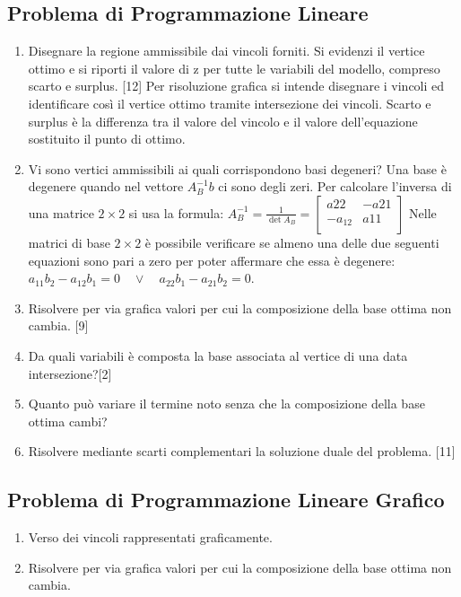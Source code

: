 \documentclass[\main/main.tex]{subfiles}
\begin{document}
\subsection{Problema di Programmazione Lineare}
\begin{enumerate}
  \item Disegnare la regione ammissibile dai vincoli forniti. Si evidenzi il vertice ottimo e si riporti il valore di z per tutte le variabili del modello, compreso scarto e surplus. [12]
        \subitem Per risoluzione grafica si intende disegnare i vincoli ed identificare così il vertice ottimo tramite intersezione dei vincoli.
        \subitem Scarto e surplus è la differenza tra il valore del vincolo e il valore dell'equazione sostituito il punto di ottimo.
  \item Vi sono vertici ammissibili ai quali corrispondono basi degeneri?
        \subitem Una base è degenere quando nel vettore $A_B^{-1}b$ ci sono degli zeri.
        \subitem Per calcolare l'inversa di una matrice $2\times 2$ si usa la formula: $A_B^{-1} = \frac{1}{\det A_B} = \begin{bmatrix}
            a{22}   & -a{21} \\
            -a_{12} & a{11}  \\
          \end{bmatrix}$
        \subitem Nelle matrici di base $2 \times 2$ è possibile verificare se almeno una delle due seguenti equazioni sono pari a zero per poter affermare che essa è degenere: $a_{11}b_2 - a_{12}b_1 = 0 \quad \lor \quad a_{22}b_1 - a_{21}b_2 = 0$.
  \item Risolvere per via grafica valori per cui la composizione della base ottima non cambia. [9]
  \item Da quali variabili è composta la base associata al vertice di una data intersezione?[2]
  \item Quanto può variare il termine noto senza che la composizione della base ottima cambi?
  \item Risolvere mediante scarti complementari la soluzione duale del problema. [11]
\end{enumerate}

\subsection{Problema di Programmazione Lineare Grafico}
\begin{enumerate}
  \item Verso dei vincoli rappresentati graficamente.
  \item Risolvere per via grafica valori per cui la composizione della base ottima non cambia.
\end{enumerate}
\end{document}
